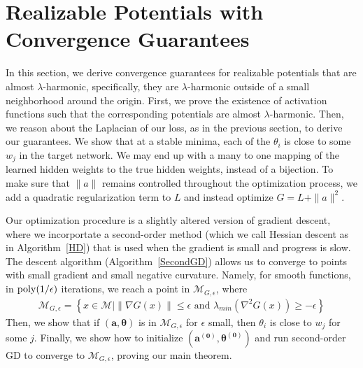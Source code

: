 
\section{Realizable Potentials with Convergence Guarantees}
\label{sec:almost-harmonic}
In this section, we derive convergence guarantees for realizable
potentials that are almost $\lambda$-harmonic, specifically, they are
$\lambda$-harmonic outside of a small neighborhood around the
origin. First, we prove the existence of activation functions such
that the corresponding potentials are almost $\lambda$-harmonic. Then,
we reason about the Laplacian of our loss, as in the previous section,
to derive our guarantees. We show that at a stable minima, each of the
$\theta_i$ is close to some $w_j$ in the target network. We may end up
with a many to one mapping of the learned hidden weights to the true
hidden weights, instead of a bijection.
To make sure that $\|a\|$ remains controlled throughout the
optimization process, we add a quadratic regularization term to $L$
and instead optimize $G = L + \|a\|^2$.



%


Our optimization procedure is a slightly altered version of gradient
descent, where we incorportate a second-order method (which we call
Hessian descent as in Algorithm~\ref{HD}) that is used when the
gradient is small and progress is slow. The descent algorithm
(Algorithm~\ref{SecondGD}) allows us to converge to points with small
gradient and small negative curvature. Namely, for smooth functions,
in $\mathrm{poly}(1/\epsilon)$ iterations, we reach a point in
$\mathcal{M}_{G, \epsilon}$, where
%
%
\begin{align*}
\mathcal{M}_{G, \epsilon} = \left\{x\in \mathcal{M} \Big| \|\nabla G(x)\|
  \leq \epsilon \text{ and } \lambda_{min}(\nabla^2 G(x)) \geq
  -\epsilon\right\}
  \end{align*}
Then, we show that if $(\boldsymbol{a,\theta})$ is in $\mathcal{M}_{G, \epsilon}$ for $\epsilon$ small, then $\theta_i$ is close to $w_j$ for some $j$. Finally, we show how to initialize $(\boldsymbol{a^{(0)},\theta^{(0)}})$ and run second-order GD to converge to $\mathcal{M}_{G,\epsilon}$, proving our main theorem.

